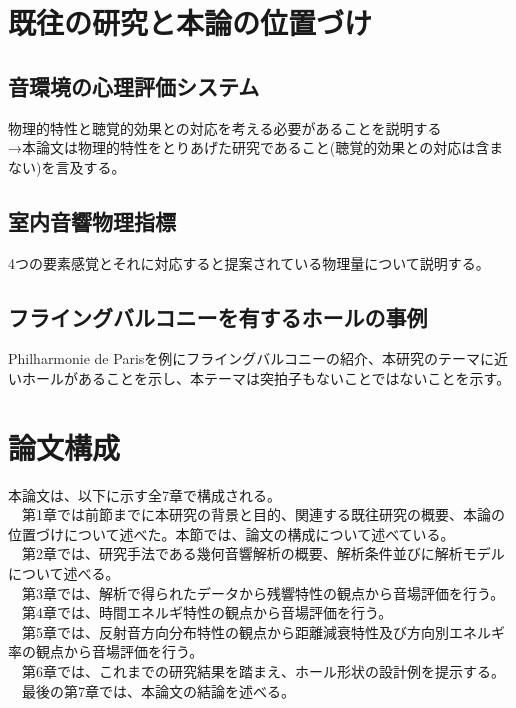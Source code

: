 \newpage
\section{既往の研究と本論の位置づけ}
\subsection{音環境の心理評価システム}
物理的特性と聴覚的効果との対応を考える必要があることを説明する
\\→本論文は物理的特性をとりあげた研究であること(聴覚的効果との対応は含まない)を言及する。

\subsection{室内音響物理指標}
4つの要素感覚とそれに対応すると提案されている物理量について説明する。

\subsection{フライングバルコニーを有するホールの事例}
Philharmonie de Parisを例にフライングバルコニーの紹介、本研究のテーマに近いホールがあることを示し、本テーマは突拍子もないことではないことを示す。

\section{論文構成}
本論文は、以下に示す全7章で構成される。
\\　第1章では前節までに本研究の背景と目的、関連する既往研究の概要、本論の位置づけについて述べた。本節では、論文の構成について述べている。
\\　第2章では、研究手法である幾何音響解析の概要、解析条件並びに解析モデルについて述べる。
\\　第3章では、解析で得られたデータから残響特性の観点から音場評価を行う。
\\　第4章では、時間エネルギ特性の観点から音場評価を行う。
\\　第5章では、反射音方向分布特性の観点から距離減衰特性及び方向別エネルギ率の観点から音場評価を行う。
\\　第6章では、これまでの研究結果を踏まえ、ホール形状の設計例を提示する。
\\　最後の第7章では、本論文の結論を述べる。
